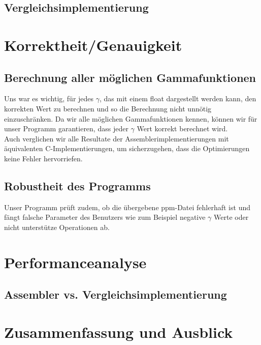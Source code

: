 \documentclass[course=erap]{aspdoc}
\begin{document}
\subsection{Vergleichsimplementierung}

\section{Korrektheit/Genauigkeit}
\subsection{Berechnung aller möglichen Gammafunktionen}
Uns war es wichtig, für jedes $\gamma$, das mit einem float dargestellt werden kann, den korrekten Wert zu berechnen und so die Berechnung nicht unnötig einzuschränken. Da wir alle möglichen Gammafunktionen kennen, können wir für unser Programm garantieren, dass jeder $\gamma$ Wert korrekt berechnet wird. 
\\
Auch verglichen wir alle Resultate der Assemblerimplementierungen mit äquivalenten C-Implementierungen, um sicherzugehen, dass die Optimierungen keine Fehler hervorriefen.  
\subsection{Robustheit des Programms}
Unser Programm prüft zudem, ob die übergebene ppm-Datei fehlerhaft ist und fängt falsche Parameter des Benutzers wie zum Beispiel negative $\gamma$ Werte oder nicht unterstütze Operationen ab. 
\section{Performanceanalyse}
\subsection{Assembler vs. Vergleichsimplementierung}


\section{Zusammenfassung und Ausblick}


{}
	
\end{document}
